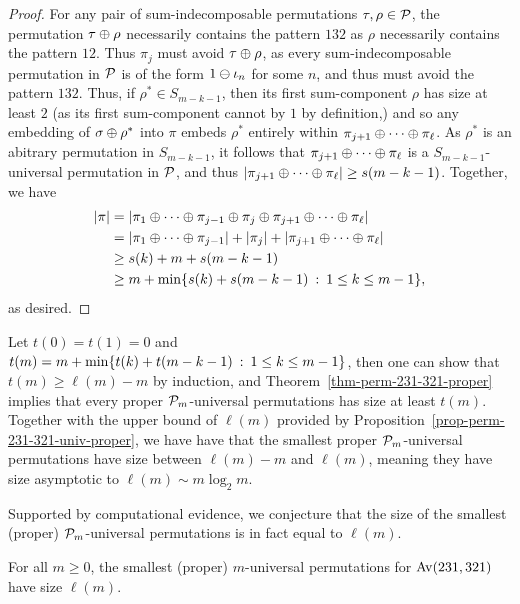 \begin{proof}
	For any pair of sum-indecomposable permutations $\tau, \rho \in \P$, the permutation $\tau \directsum \rho$ necessarily contains the pattern $132$ as $\rho$ necessarily contains the pattern $12$. Thus $\pi_j$ must avoid $\tau \directsum \rho$, as every sum-indecomposable permutation in $\P$ is of the form $1 \skewsum \iota_n$ for some $n$, and thus must avoid the pattern $132$. Thus, if $\rho^\ast \in S_{m-k-1}$, then its first sum-component $\rho$ has size at least $2$ (as its first sum-component cannot by $1$ by definition,) and so any embedding of $\sigma \directsum \rho^\ast$ into $\pi$ embeds $\rho^\ast$ entirely within $\pi_{j+1} \directsum \cdots \directsum \pi_\ell$. As $\rho^\ast$ is an abitrary permutation in $S_{m-k-1}$, it follows that $\pi_{j+1} \directsum \cdots \directsum \pi_\ell$ is a $S_{m-k-1}$-universal permutation in $\P$, and thus $\size{\pi_{j+1} \directsum \cdots \directsum \pi_\ell} \ge s(m-k-1)$. Together, we have
	\begin{align*}
		\size{\pi}
			&= \size{\pi_{1} \directsum \cdots \directsum \pi_{j-1} \directsum \pi_j \directsum \pi_{j+1} \directsum \cdots \directsum \pi_\ell} \\
			&= \size{\pi_{1} \directsum \cdots \directsum \pi_{j-1}} + \size{\pi_j} + \size{\pi_{j+1} \directsum \cdots \directsum \pi_\ell} \\
			& \ge s(k) + m + s(m-k-1) \\
			& \ge m + \min\{s(k) + s(m-k-1) \st 1 \le k \le m-1\},
	\end{align*}
	as desired.
\end{proof}

Let $t(0) = t(1) = 0$ and $t(m) = m + \min\{t(k)+t(m-k-1) \st 1 \le k \le m-1\}$, then one can show that $t(m) \ge \ell(m) - m$ by induction, and Theorem~\ref{thm-perm-231-321-proper} implies that every proper $\P_m$-universal permutations has size at least $t(m)$. Together with the upper bound of $\ell(m)$ provided by Proposition~\ref{prop-perm-231-321-univ-proper}, we have have that the smallest proper $\P_m$-universal permutations have size between $\ell(m) - m$ and $\ell(m)$, meaning they have size asymptotic to $\ell(m) \sim m \log_2 m$.

Supported by computational evidence, we conjecture that the size of the smallest (proper) $\P_m$-universal permutations is in fact equal to $\ell(m)$.
\begin{conjecture}
	For all $m \ge 0$, the smallest (proper) $m$-universal permutations for $\Av(231, 321)$ have size $\ell(m)$.
\end{conjecture}

